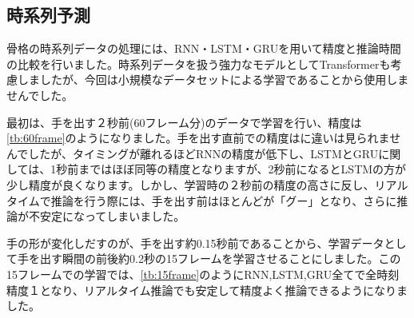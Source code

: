 \subsection{時系列予測}
骨格の時系列データの処理には、RNN・LSTM・GRUを用いて精度と推論時間の比較を行いました。時系列データを扱う強力なモデルとしてTransformerも考慮しましたが、今回は小規模なデータセットによる学習であることから使用しませんでした。

最初は、手を出す２秒前(60フレーム分)のデータで学習を行い、精度は\ref{tb:60frame}のようになりました。手を出す直前での精度はに違いは見られませんでしたが、タイミングが離れるほどRNNの精度が低下し、LSTMとGRUに関しては、1秒前まではほぼ同等の精度となりますが、2秒前になるとLSTMの方が少し精度が良くなります。しかし、学習時の２秒前の精度の高さに反し、リアルタイムで推論を行う際には、手を出す前はほとんどが「グー」となり、さらに推論が不安定になってしまいました。

手の形が変化しだすのが、手を出す約0.15秒前であることから、学習データとして手を出す瞬間の前後約0.2秒の15フレームを学習させることにしました。この15フレームでの学習では、\ref{tb:15frame}のようにRNN,LSTM,GRU全てで全時刻精度１となり、リアルタイム推論でも安定して精度よく推論できるようになりました。

